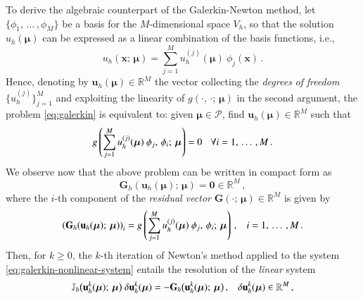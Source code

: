 \documentclass{elsarticle}
\theoremstyle{theorem}
\theoremstyle{definition}
\theoremstyle{remark}
\theoremstyle{proposition}
\numberwithin{figure}{section}
\newcommand{\bg}[1]{\boldsymbol{#1}}
\begin{document}
		To derive the algebraic counterpart of the Galerkin-Newton method, let $\big\lbrace \phi_1, \, \ldots \, , \phi_M \big\rbrace$ be a basis for the $M$-dimensional space $V_h$, so that the solution $u_h(\bg{\mu})$ can be expressed as a linear combination of the basis functions, i.e.,
		\begin{equation}
			\label{eq:galerkin-solution}
			u_h(\bg{x}; \, \bg{\mu}) = \sum_{j = 1}^M u_h^{(j)}(\bg{\mu}) ~ \phi_j(\bg{x}) \, .
		\end{equation} 
		Hence, denoting by $\mathbf{u}_h(\bg{\mu}) \in \mathbb{R}^M$ the vector collecting the \emph{degrees} \emph{of} \emph{freedom} $\big\lbrace u_h^{(j)} \big\rbrace_{j = 1}^M$ and exploiting the linearity of $g(\cdot, \, \cdot; \, \bg{\mu})$ in the second argument, the problem \eqref{eq:galerkin} is equivalent to: given $\bg{\mu} \in \mathcal{P}$, find $\mathbf{u}_h(\bg{\mu}) \in \mathbb{R}^M$ such that
		\begin{equation*}
			\label{eq:galerkin-algebraic}
			g \left( \sum_{j = 1}^M u_h^{(j)}(\bg{\mu}) ~ \phi_j, \, \phi_i; \, \bg{\mu} \right) = 0 \hspace*{0.3cm} \forall i = 1, \, \ldots \, , M \, .
		\end{equation*}
		We observe now that the above problem can be written in compact form as
		\begin{equation}
			\label{eq:galerkin-nonlinear-system}
			\mathbf{G}_h (\mathbf{u}_h(\bg{\mu}); \, \bg{\mu}) = \bg{0} \in \mathbb{R}^M \, ,
		\end{equation}
		where the $i$-th component of the \emph{residual vector} $\mathbf{G}(\cdot; \, \bg{\mu}) \in \mathbb{R}^M$ is given by
		\begin{equation}
			\label{eq:galerkin-nonlinear-system-equation}
			\left( \mathbf{G}_h(\mathbf{u}_h(\bg{\mu}); \, \bg{\mu}) \right)_i = g \left( \sum_{j = 1}^M u_h^{(j)}(\bg{\mu}) ~ \phi_j, \, \phi_i; \, \bg{\mu} \right) \, , \hspace*{0.3cm} i = 1, \, \ldots \, , M \, .
		\end{equation}
		Then, for $k \geq 0$, the $k$-th iteration of Newton's method applied to the system \eqref{eq:galerkin-nonlinear-system} entails the resolution of the \emph{linear} system
		\begin{equation}
			\label{eq:galerkin-linear-system}
			\mathbb{J}_h \big( \mathbf{u}^k_h(\bg{\mu}); \, \bg{\mu} \big) ~ \delta \mathbf{u}^k_h(\bg{\mu}) = - \mathbf{G}_h \big( \mathbf{u}^k_h(\bg{\mu}); \, \bg{\mu} \big) \, , \hspace*{0.3cm} \delta \mathbf{u}^k_h(\bg{\mu}) \in \mathbb{R}^M \, ,
		\end{equation}
\end{document}
